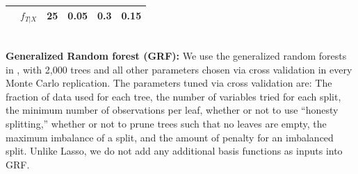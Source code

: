 \documentclass[lettersize, 12pt]{article}
\begin{document}
{\begin{table}[h]
\begin{center}
\begin{tabular*}{\textwidth}{@{}cccccc@{}}
&$f_{T|X}$  &25 &0.05&0.3&0.15\\
\hline
\hline 
   \end{tabular*}%
       \end{center}
       \end{table}
\\[3pt]
\textbf{Generalized Random forest (GRF):}
We use the generalized random forests in \cite{ATW19AS}, with 2,000 trees and all other parameters chosen via cross validation in every Monte Carlo replication. The parameters tuned via cross validation are: The fraction of data used for each tree, the number of variables tried for each split, the minimum number of observations per leaf, whether or not to use ``honesty splitting,'' whether or not to prune trees such that no leaves are empty, the maximum imbalance of a split, and the amount of penalty for an imbalanced split. Unlike Lasso, we do not add any additional basis functions as inputs into GRF.





}
\end{document}

